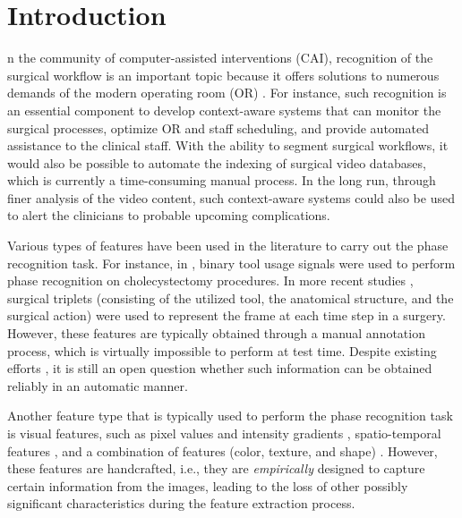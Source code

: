 \documentclass[journal]{IEEEtran} \usepackage{amssymb}
\begin{document}
\section{Introduction}

n the community of computer-assisted interventions (CAI), recognition
of the surgical workflow is an important topic because it offers solutions
to numerous demands of the modern operating room (OR) \cite{cleary_OR2020}. For instance, such recognition is an essential component to develop context-aware systems  that can monitor the surgical processes, optimize OR and staff scheduling, and provide automated assistance to the clinical staff.  With the ability to segment surgical workflows, it would also be possible to automate the indexing of surgical video databases, which is currently a time-consuming manual process. In the long run, through finer analysis of the video content, such context-aware systems could also be used to alert the clinicians to probable upcoming complications.

Various types of features have been used in the literature to carry
out the phase recognition task. For instance, in \cite{bouarfa_jbmi2011,padoy_mia2012},
binary tool usage signals were used to perform phase recognition on
cholecystectomy procedures. In more recent studies \cite{katic_ipcai2014,forestier_bmi2013},
surgical triplets (consisting of the utilized tool, the anatomical
structure, and the surgical action) were used to represent the frame
at each time step in a surgery. However, these features are typically
obtained through a manual annotation process, which is virtually
impossible to perform at test time. Despite existing efforts \cite{lalys_ijcars2012}, it is still an open question whether such information can be obtained reliably in an automatic manner.

Another feature type that is typically used to perform the phase
recognition task is visual features, such as pixel values and
intensity gradients \cite{blum_miccai2010}, spatio-temporal features
\cite{zappella_mia2013}, and a combination of features (color, texture,
and shape) \cite{lalys_tbme2012}. However, these features are handcrafted,
i.e., they are \textit{empirically} designed to capture certain information
from the images, leading to the loss of other possibly significant characteristics
during the feature extraction process. 
\end{document}
